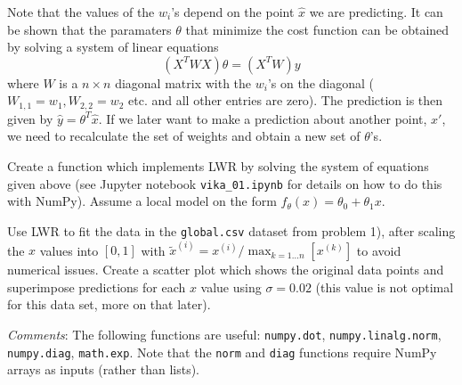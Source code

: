 \documentclass[11pt]{article}
\begin{document}
Note that the values of the \(w_i\)'s depend on the point \(\hat{x}\) we
are predicting. It can be shown that the paramaters \(\theta\) that
minimize the cost function can be obtained by solving a system of linear
equations \[
(X^T W X)\theta = (X^T W)y
\] where \(W\) is a \(n \times n\) diagonal matrix with the \(w_i\)'s on
the diagonal (\(W_{1,1}=w_1, W_{2,2}=w_2\) etc. and all other entries
are zero). The prediction is then given by \(\hat{y}=\theta^T \hat{x}\).
If we later want to make a prediction about another point, \(x'\), we
need to recalculate the set of weights and obtain a new set of
\(\theta\)'s.

Create a function which implements LWR by solving the system of
equations given above (see Jupyter notebook \texttt{vika\_01.ipynb} for
details on how to do this with NumPy). Assume a local model on the form
\(f_\theta(x)=\theta_0 + \theta_1 x\).

Use LWR to fit the data in the \texttt{global.csv} dataset from problem
1), after scaling the \(x\) values into \([0,1]\) with
\(\tilde{x}^{(i)}=x^{(i)}/\max_{k=1 \ldots n}[x^{(k)}]\) to avoid
numerical issues. Create a scatter plot which shows the original data
points and superimpose predictions for each \(x\) value using
\(\sigma=0.02\) (this value is not optimal for this data set, more on
that later).

\emph{Comments}: The following functions are useful: \texttt{numpy.dot},
\texttt{numpy.linalg.norm}, \texttt{numpy.diag}, \texttt{math.exp}. Note
that the \texttt{norm} and \texttt{diag} functions require NumPy arrays
as inputs (rather than lists).
\end{document}
